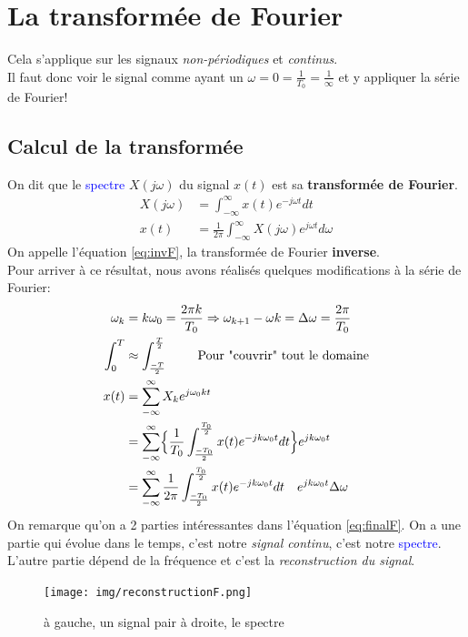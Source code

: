 \documentclass{report}
\begin{document}
\section{La transformée de Fourier}
Cela s'applique sur les signaux \textit{non-périodiques} et \textit{continus}.\\
Il faut donc voir le signal comme ayant un $\omega = 0 = \frac{1}{T_0} = \frac{1}{\infty}$ et y appliquer la série de Fourier!

\subsection{Calcul de la transformée}
On dit que le \textcolor{blue}{spectre} $X(j\omega)$ du signal $x(t)$ est sa \textbf{transformée de Fourier}.
\begin{align}
X(j\omega) &= \int_{-\infty}^{\infty} x(t) e^{-j \omega t}dt\\
x(t) &= \frac{1}{2\pi} \int_{-\infty}^{\infty} X(j\omega) e^{j\omega t} d\omega \label{eq:invF}
\end{align}
On appelle l'équation \ref{eq:invF}, la transformée de Fourier \textbf{inverse}.\\

Pour arriver à ce résultat, nous avons réalisés quelques modifications à la série de Fourier:
\begin{align}
\omega_k &= k \omega_0 = \frac{2 \pi k}{T_0} \Rightarrow \omega_{k+1} - \omega{k} = \Delta \omega = \frac{2\pi}{T_0}\\
\int_0^{T} & \approx \int_{\frac{-T}{2}}^{\frac{T}{2}} \qquad \text{ Pour "couvrir" tout le domaine}\\
x(t) &= \sum_{-\infty}^{\infty} X_k e^{j \omega_0 k t}\\
	 &= \sum_{-\infty}^{\infty} \Bigl \{ \frac{1}{T_0} \int_{\frac{-T_0}{2}}^{\frac{T_0}{2}} x(t) e^{-j k \omega_0 t} dt \Bigl \} e^{j k \omega_0 t}\\
	 &= \sum_{-\infty}^{\infty} \frac{1}{2 \pi} \int_{\frac{-T_0}{2}}^{\frac{T_0}{2}} x(t) e^{-j k \omega_0 t} dt\quad e^{j k \omega_0 t} \Delta \omega \label{eq:finalF}
\end{align} 
On remarque qu'on a 2 parties intéressantes dans l'équation \ref{eq:finalF}. On a une partie qui évolue dans le temps, c'est notre \textit{signal continu}, c'est notre \textcolor{blue}{spectre}. L'autre partie dépend de la fréquence et c'est la \textit{reconstruction du signal}. 
\begin{figure}[H]
\centering
\texttt{[image: img/reconstructionF.png]}
\caption{à gauche, un signal pair \qquad à droite, le spectre}
\end{figure}
\end{document}

